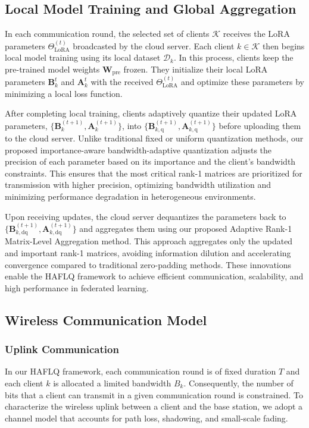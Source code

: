 \documentclass[journal]{IEEEtran}
\begin{document}
\subsection{Local Model Training and Global Aggregation}
In each communication round, the selected set of clients \(\mathcal{K}\) receives the LoRA parameters \(\Theta_{\text{LoRA}}^{(t)}\) broadcasted by the cloud server. Each client \(k \in \mathcal{K}\) then begins local model training using its local dataset \(\mathcal{D}_k\). In this process, clients keep the pre-trained model weights \(\mathbf{W}_{\text{pre}}\) frozen. They initialize their local LoRA parameters \(\mathbf{B}_k^t\) and \(\mathbf{A}_k^t\) with the received \(\Theta_{\text{LoRA}}^{(t)}\) and optimize these parameters by minimizing a local loss function.

After completing local training, clients adaptively quantize their updated LoRA parameters, \(\{\mathbf{B}_k^{(t+1)}, \mathbf{A}_k^{(t+1)}\}\), into \(\{\mathbf{B}_{k,\text{q}}^{(t+1)}, \mathbf{A}_{k,\text{q}}^{(t+1)}\}\) before uploading them to the cloud server. Unlike traditional fixed or uniform quantization methods, our proposed importance-aware bandwidth-adaptive quantization adjusts the precision of each parameter based on its importance and the client’s bandwidth constraints. This ensures that the most critical rank-1 matrices are prioritized for transmission with higher precision, optimizing bandwidth utilization and minimizing performance degradation in heterogeneous environments.


Upon receiving updates, the cloud server dequantizes the parameters back to \(\{\mathbf{B}_{k,\text{dq}}^{(t+1)}, \mathbf{A}_{k,\text{dq}}^{(t+1)}\}\) and aggregates them using our proposed Adaptive Rank-1 Matrix-Level Aggregation method. This approach aggregates only the updated and important rank-1 matrices, avoiding information dilution and accelerating convergence compared to traditional zero-padding methods. These innovations enable the HAFLQ framework to achieve efficient communication, scalability, and high performance in federated learning.

\subsection{Wireless Communication Model}
\subsubsection{Uplink Communication}
In our HAFLQ framework, each communication round is of fixed duration $T$ and each client $k$ is allocated a limited bandwidth $B_k$. Consequently, the number of bits that a client can transmit in a given communication round is constrained.
To characterize the wireless uplink between a client and the base station, we adopt a channel model that accounts for path loss, shadowing, and small-scale fading.
\end{document}
